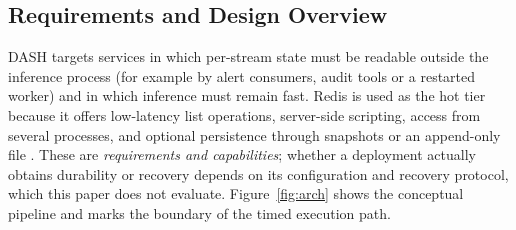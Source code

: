 \documentclass[a4paper,fleqn]{cas-dc}
\begin{document}
\subsection{Requirements and Design Overview}
\label{subsec:design}
DASH targets services in which per-stream state must be readable outside the inference process (for example by alert consumers, audit tools or a restarted worker) and in which inference must remain fast. Redis is used as the hot tier because it offers low-latency list operations, server-side scripting, access from several processes, and optional persistence through snapshots or an append-only file \citep{redis2023}. These are \emph{requirements and capabilities}; whether a deployment actually obtains durability or recovery depends on its configuration and recovery protocol, which this paper does not evaluate. Figure~\ref{fig:arch} shows the conceptual pipeline and marks the boundary of the timed execution path.
\end{document}
